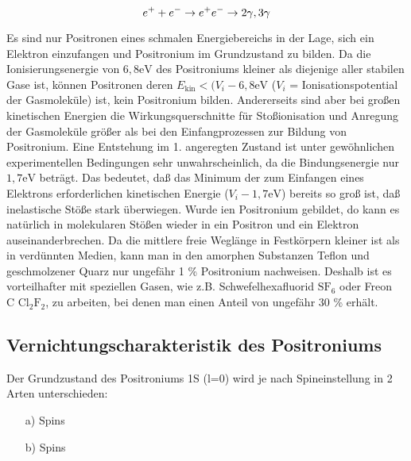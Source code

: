 \begin{equation*}
 e^+ + e^- \rightarrow e^+ e^- \rightarrow 2\gamma, 3\gamma
\end{equation*}

Es sind nur Positronen eines schmalen Energiebereichs in der Lage, sich ein Elektron einzufangen und Positronium im Grundzustand zu bilden.
Da die Ionisierungsenergie von $6,8 \text{eV}$ des Positroniums kleiner als diejenige aller stabilen Gase ist, können Positronen deren $E_\text{kin} < (V_i - 6,8 \text{eV}$ ($V_i$ = Ionisationspotential der Gasmoleküle) ist, kein Positronium bilden. Andererseits sind aber bei großen kinetischen Energien die Wirkungsquerschnitte für Stoßionisation und Anregung der Gasmoleküle größer als bei den Einfangprozessen zur Bildung von Positronium. Eine Entstehung im 1. angeregten Zustand ist unter gewöhnlichen experimentellen Bedingungen sehr unwahrscheinlich, da die Bindungsenergie nur $1,7 \text{eV}$ beträgt. Das bedeutet, daß das Minimum der zum Einfangen eines Elektrons erforderlichen kinetischen Energie ($V_i - 1,7 \text{eV}$) bereits so groß ist, daß inelastische Stöße stark überwiegen. Wurde ien Positronium gebildet, do kann es natürlich in molekularen Stößen wieder in ein Positron und ein Elektron auseinanderbrechen. Da die mittlere freie Weglänge in Festkörpern kleiner ist als in verdünnten Medien, kann man in den amorphen Substanzen Teflon und geschmolzener Quarz nur ungefähr 1 \% Positronium nachweisen. Deshalb ist es vorteilhafter mit speziellen Gasen, wie z.B. Schwefelhexafluorid $\text{SF}_6$ oder Freon $\text{C Cl}_2\text{F}_2$, zu arbeiten, bei denen man einen Anteil von ungefähr 30 \% erhält.

\subsection{Vernichtungscharakteristik des Positroniums}

Der Grundzustand des Positroniums 1S (l=0) wird je nach Spineinstellung in 2 Arten unterschieden:
\begin{enumerate}
 \item[a)] Spins
 \item[b)] Spins 
\end{enumerate}
